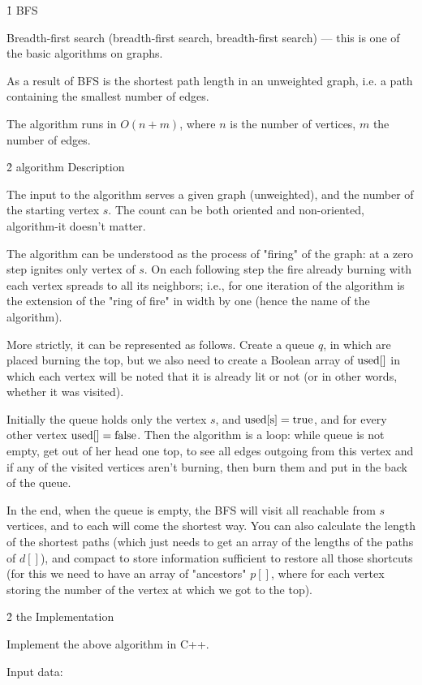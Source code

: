 \h1{ BFS }

Breadth-first search (breadth-first search, breadth-first search) --- this is one of the basic algorithms on graphs.

As a result of BFS is the shortest path length in an unweighted graph, i.e. a path containing the smallest number of edges.

The algorithm runs in $O (n+m)$, where $n$ is the number of vertices, $m$ the number of edges.


\h2{ algorithm Description }

The input to the algorithm serves a given graph (unweighted), and the number of the starting vertex $s$. The count can be both oriented and non-oriented, algorithm-it doesn't matter.

The algorithm can be understood as the process of "firing" of the graph: at a zero step ignites only vertex of $s$. On each following step the fire already burning with each vertex spreads to all its neighbors; i.e., for one iteration of the algorithm is the extension of the "ring of fire" in width by one (hence the name of the algorithm).

More strictly, it can be represented as follows. Create a queue $q$, in which are placed burning the top, but we also need to create a Boolean array of $\rm used []$ in which each vertex will be noted that it is already lit or not (or in other words, whether it was visited).

Initially the queue holds only the vertex $s$, and $\rm used[s] = true$, and for every other vertex $\rm used[] = false$. Then the algorithm is a loop: while queue is not empty, get out of her head one top, to see all edges outgoing from this vertex and if any of the visited vertices aren't burning, then burn them and put in the back of the queue.

In the end, when the queue is empty, the BFS will visit all reachable from $s$ vertices, and to each will come the shortest way. You can also calculate the length of the shortest paths (which just needs to get an array of the lengths of the paths of $d[]$), and compact to store information sufficient to restore all those shortcuts (for this we need to have an array of "ancestors" $p[]$, where for each vertex storing the number of the vertex at which we got to the top).


\h2{ the Implementation }

Implement the above algorithm in C++.

Input data:

